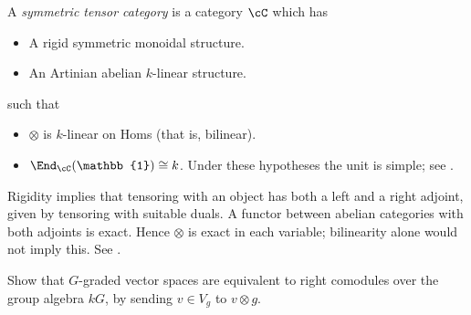 \begin{definition}
    A \textit{symmetric tensor category} is a category $\cC$ which has
    \begin{itemize}
        \item[1)] A rigid symmetric monoidal structure. 
        \item[2)] An Artinian abelian $k$-linear structure.
    \end{itemize}
    such that
    \begin{itemize}
        \item[1)] $\otimes$ is $k$-linear on Homs (that is, bilinear).
        \item[2)] $\End_{\cC}(\mathbb{1}) \cong k$. Under these hypotheses the unit is simple; see \cite[Section 4.3]{EGNO}.
    \end{itemize}
\end{definition}
\begin{remark}
    Rigidity implies that tensoring with an object has both a left and a right adjoint, given by tensoring with suitable duals. A functor between abelian categories with both adjoints is exact. Hence $\otimes$ is exact in each variable; bilinearity alone would not imply this. See \cite[Proposition 4.2.1]{EGNO}.
\end{remark}
\begin{exercise}
Show that $G$-graded vector spaces are equivalent to right comodules over the group algebra $kG$, by sending $v\in V_g$ to $v\otimes g$.
\end{exercise}
